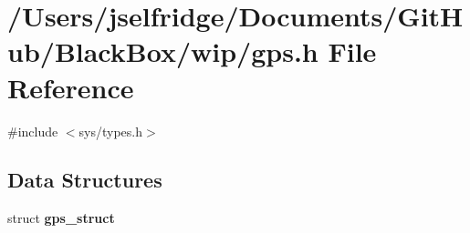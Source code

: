 \section{/\+Users/jselfridge/\+Documents/\+Git\+Hub/\+Black\+Box/wip/gps.h File Reference}
\label{gps_8h}
{\ttfamily \#include $<$sys/types.\+h$>$}\newline
\subsection*{Data Structures}
\begin{DoxyCompactItemize}
\item 
struct \textbf{ gps\+\_\+struct}
\end{DoxyCompactItemize}

